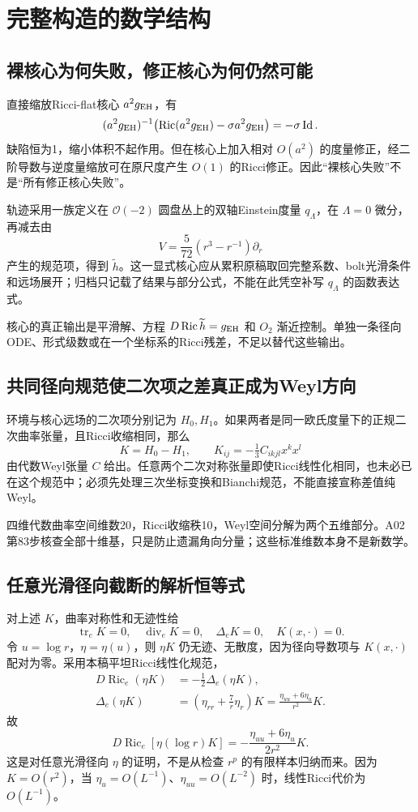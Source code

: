 \documentclass[UTF8,a4paper,11pt,fontset=fandol]{ctexart}
\numberwithin{equation}{section}
\theoremstyle{definition}
\newcommand{\Ric}{\operatorname{Ric}}
\newcommand{\tr}{\operatorname{tr}}
\newcommand{\Id}{\operatorname{Id}}
\begin{document}
\section{完整构造的数学结构}
\subsection{裸核心为何失败，修正核心为何仍然可能}
直接缩放Ricci-flat核心 $a^2g_{\rm EH}$，有
\[
(a^2g_{\rm EH})^{-1}\bigl(\Ric(a^2g_{\rm EH})-\sigma a^2g_{\rm EH}\bigr)=-\sigma\Id.
\]
缺陷恒为1，缩小体积不起作用。但在核心上加入相对 $O(a^2)$ 的度量修正，经二阶导数与逆度量缩放可在原尺度产生 $O(1)$ 的Ricci修正。因此“裸核心失败”不是“所有修正核心失败”。

轨迹采用一族定义在 $\mathcal O(-2)$ 圆盘丛上的双轴Einstein度量 $q_\Lambda$，在 $\Lambda=0$ 微分，再减去由
\[
V=\frac5{72}(r^3-r^{-1})\partial_r
\]
产生的规范项，得到 $\widetilde h$。这一显式核心应从累积原稿取回完整系数、bolt光滑条件和远场展开；归档只记载了结果与部分公式，不能在此凭空补写 $q_\Lambda$ 的函数表达式。

核心的真正输出是平滑解、方程 $D\Ric\widetilde h=g_{\rm EH}$ 和 $O_2$ 渐近控制。单独一条径向ODE、形式级数或在一个坐标系的Ricci残差，不足以替代这些输出。

\subsection{共同径向规范使二次项之差真正成为Weyl方向}
环境与核心远场的二次项分别记为 $H_0,H_1$。如果两者是同一欧氏度量下的正规二次曲率张量，且Ricci收缩相同，那么
\[
K=H_0-H_1,\qquad
K_{ij}=-\tfrac13 C_{ikjl}x^kx^l
\]
由代数Weyl张量 $C$ 给出。任意两个二次对称张量即使Ricci线性化相同，也未必已在这个规范中；必须先处理三次坐标变换和Bianchi规范，不能直接宣称差值纯Weyl。

四维代数曲率空间维数20，Ricci收缩秩10，Weyl空间分解为两个五维部分。A02第83步核查全部十维基，只是防止遗漏角向分量；这些标准维数本身不是新数学。

\subsection{任意光滑径向截断的解析恒等式}
对上述 $K$，曲率对称性和无迹性给
\[
\tr_eK=0,\quad \operatorname{div}_eK=0,\quad
\Delta_eK=0,\quad K(x,\cdot)=0.
\]
令 $u=\log r$，$\eta=\eta(u)$，则 $\eta K$ 仍无迹、无散度，因为径向导数项与 $K(x,\cdot)$ 配对为零。采用本稿平坦Ricci线性化规范，
\begin{align}
D\Ric_e(\eta K)&=-\tfrac12\Delta_e(\eta K),\\
\Delta_e(\eta K)&=\left(\eta_{rr}+\frac7r\eta_r\right)K
=\frac{\eta_{uu}+6\eta_u}{r^2}K.
\end{align}
故
\begin{equation}\label{eq:logidentity}
\boxed{D\Ric_e[\eta(\log r)K]=-
\frac{\eta_{uu}+6\eta_u}{2r^2}K.}
\end{equation}
这是对任意光滑径向 $\eta$ 的证明，不是从检查 $r^p$ 的有限样本归纳而来。因为 $K=O(r^2)$，当 $\eta_u=O(L^{-1})$、$\eta_{uu}=O(L^{-2})$ 时，线性Ricci代价为 $O(L^{-1})$。
\end{document}
